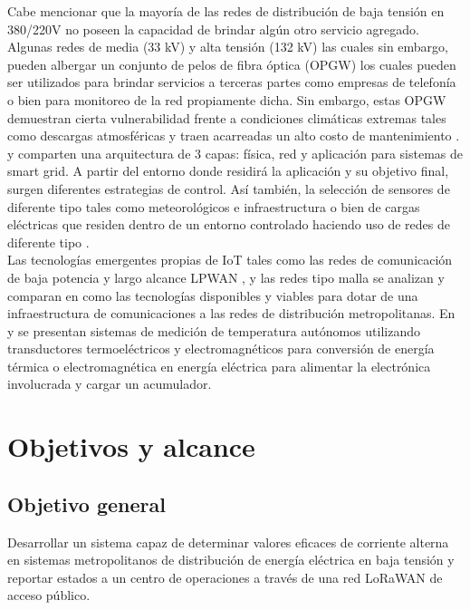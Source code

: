 Cabe mencionar que la mayoría de las redes de distribución de baja tensión en 380/220V no poseen la capacidad de brindar algún otro servicio agregado. Algunas redes de media (33 kV) y alta tensión (132 kV) las cuales sin embargo, pueden albergar un conjunto de pelos de fibra óptica (OPGW) los cuales pueden ser utilizados para brindar servicios a terceras partes como empresas de telefonía o bien para monitoreo de la red propiamente dicha. Sin embargo, estas OPGW demuestran cierta vulnerabilidad frente a condiciones climáticas extremas tales como descargas atmosféricas y traen acarreadas un alto costo de mantenimiento \citep{ARTICLE:1}.\\
\citep{ARTICLE:2} y \citep{ARTICLE:3} comparten una arquitectura de 3 capas: física, red y aplicación para sistemas de smart grid. 
A partir del entorno donde residirá la aplicación y su objetivo final, surgen diferentes estrategias de control. Así también, la selección de sensores de diferente tipo tales como meteorológicos e infraestructura \citep{ARTICLE:3} o bien de cargas eléctricas que residen dentro de un entorno controlado haciendo uso de redes de diferente tipo \citep{ARTICLE:2}.\\
Las tecnologías emergentes propias de IoT tales como las redes de comunicación de baja potencia y largo alcance LPWAN \citep{rfc8376}, y las redes tipo malla se analizan y comparan en \citep{ARTICLE:4} como las tecnologías disponibles y viables para dotar de una infraestructura de comunicaciones a las redes de distribución metropolitanas. En \citep{ARTICLE:5} y \citep{Hua} se presentan sistemas de medición de temperatura autónomos utilizando transductores termoeléctricos y electromagnéticos para conversión de energía térmica o electromagnética en energía eléctrica para alimentar la electrónica involucrada y cargar un acumulador.


\section{Objetivos y alcance}
\subsection{Objetivo general}
Desarrollar un sistema capaz de determinar valores eficaces de corriente alterna en sistemas metropolitanos de distribución de energía eléctrica en baja tensión y reportar estados a un centro de operaciones a través de una red LoRaWAN de acceso público.\\
